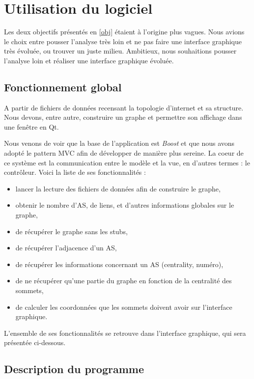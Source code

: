 \section{Utilisation du logiciel}

Les deux objectifs présentés en \ref{obj} étaient à l'origine plus vagues. Nous avions le choix entre pousser l'analyse très loin et ne pas faire une interface graphique très évoluée, ou trouver un juste milieu. Ambitieux, nous souhaitions pousser l'analyse loin et réaliser une interface graphique évoluée.

\subsection{Fonctionnement global}
A partir de fichiers de données recensant la topologie d'internet et sa structure. Nous devons, entre autre, construire un graphe et permettre son affichage dans une fenêtre en Qt.

Nous venons de voir que la base de l'application est \textit{Boost} et que nous avons adopté le pattern MVC afin de développer de manière plus sereine. La coeur de ce système est la communication entre le modèle et la vue, en d'autres termes : le contrôleur. Voici la liste de ses fonctionnalités :
\begin{itemize}
 \item lancer la lecture des fichiers de données afin de construire le graphe,
\item obtenir le nombre d'AS, de liens, et d'autres informations globales sur le graphe,
\item de récupérer le graphe sans les stubs,
\item de récupérer l'adjacence d'un AS,
\item de récupérer les informations concernant un AS (centrality, numéro),
\item de ne récupérer qu'une partie du graphe en fonction de la centralité des sommets,
\item de calculer les coordonnées que les sommets doivent avoir sur l'interface graphique.
\end{itemize}

L'ensemble de ses fonctionnalités se retrouve dans l'interface graphique, qui sera présentée ci-dessous.

\subsection{Description du programme}

